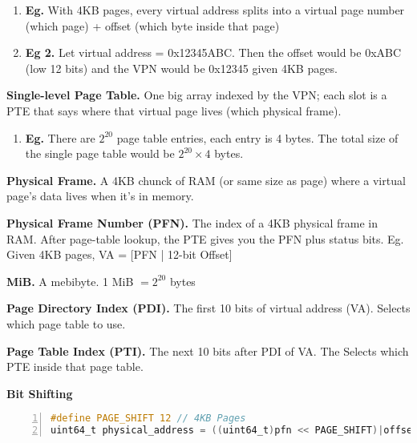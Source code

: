 \documentclass[12pt]{article}
\begin{document}
\begin{enumerate}
    \item[]{\bf Eg.} {With 4KB pages, every virtual address splits into a virtual page number (which page) + offset (which byte inside that page)} \par

    \item[]{\bf Eg 2.} {Let virtual address = 0x12345ABC. Then the offset would be 0xABC (low 12 bits) and the VPN would be 0x12345 given 4KB pages.} 
\end{enumerate}

\vspace{1em}
\setlength{\parindent}{0pt} 

{\bf Single-level Page Table.} {One big array indexed by the VPN; each slot is a PTE that says where that virtual page lives (which physical frame).} \par

\begin{enumerate}
    \item[]{\bf Eg.} {There are $2^{20}$ page table entries, each entry is 4 bytes. The total size of the single page table would be $2^{20} \times 4$ bytes.} \par
\end{enumerate}

\vspace{1em}

{\bf Physical Frame.} {A 4KB chunck of RAM (or same size as page) where a virtual page's data lives when it's in memory.} 

{\bf Physical Frame Number (PFN).} {The index of a 4KB physical frame in RAM. After page-table lookup, the PTE gives you the PFN plus status bits. Eg. Given 4KB pages, VA = [PFN | 12-bit Offset]}

{\bf MiB.} {A mebibyte. 1 MiB $= 2^{20}$ bytes} 

{\bf Page Directory Index (PDI).} {The first 10 bits of virtual address (VA). Selects which page table to use.} \par

{\bf Page Table Index (PTI).} {The next 10 bits after PDI of VA. The Selects which PTE inside that page table.} \par


\vspace{10em}
{\bf Bit Shifting} \par
\begin{lstlisting}[language=C, numbers=left, basicstyle=\ttfamily]
#define PAGE_SHIFT 12 // 4KB Pages
uint64_t physical_address = ((uint64_t)pfn << PAGE_SHIFT)|offset; 

\end{lstlisting}
\end{document}
